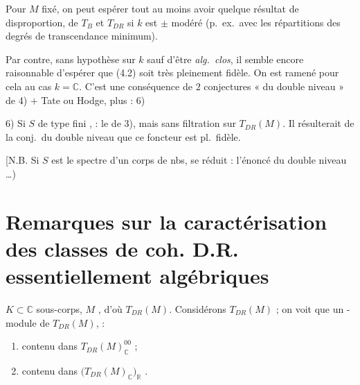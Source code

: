 \documentclass[11pt,a4paper]{article}
\begin{document}
Pour $M$ fixé, on peut espérer tout au moins avoir quelque résultat de
disproportion, de $T_{B}$ et $T_{DR}$ si $k$ est $\pm$ modéré (p.\ ex.\ avec les
répartitions des degrés de transcendance minimum).


Par contre, sans hypothèse sur $k$ sauf d'être \emph{alg.\ clos}, il semble
encore raisonnable d'espérer que (4.2) soit très pleinement fidèle. On est ramené
pour cela au cas $k = \mathbb{C}$. C'est une conséquence de $2$ conjectures
« du double niveau » de 4) $+$ Tate ou Hodge, plus : 6)


6) Si $S$ de type fini , \ill{} : le
 de 3), mais sans filtration sur $T_{DR}(M)$. Il résulterait de
la conj.\ du double niveau  que ce foncteur
est pl.\ fidèle.

[N.B. Si $S$ est le spectre d'un corps de nbs,  se réduit :
l'énoncé du double niveau …)

\section{Remarques sur la caractérisation des classes de coh. D.R. essentiellement algébriques}



$K \subset \mathbb{C}$ sous-corps, $M$ , d'où $T_{DR}(M)$.
Considérons $T_{DR}(M)$  ;
on voit que \ill{} un \ill{}-module de $T_{DR}(M)$,  \ill{} :

\begin{enumerate}
  \item[a)] contenu dans $T_{DR}(M)^{00}_{\mathbb{C}}$ ;
  \item[b)] 
  contenu dans $\bigl( T_{DR}(M)_{\mathbb{C}} \bigr)_{\mathbb{R}}$
  .
\end{enumerate}
\end{document}
